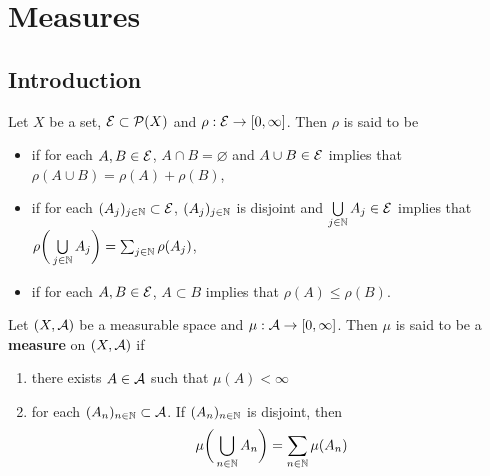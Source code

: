 \documentclass{book}
\begin{document}
	
	
	
	
	
	
	
	
	
	
	
	
	
	
	
	
	
	
	
	
	
	
	
	
	
	
	
	
	
	
	
	
	
	
	
	
	
	
	\newpage
	\chapter{Measures}
	
	\section{Introduction}
	
	
	
	\begin{defn} 
		Let $X$ be a set, $\mathcal{E} \subset \mathcal{P}(X)$ and $\rho: \mathcal{E} \rightarrow [0,\infty]$. Then $\rho$ is said to be 
		\begin{itemize}
			\item {} if for each $A, B \in \mathcal{E}$, $A \cap B = \varnothing$ and $A \cup B \in \mathcal{E}$ implies that $\rho(A \cup B) = \rho(A) + \rho(B)$,
			\item {} if for each $(A_j)_{j \in \mathbb{N}} \subset \mathcal{E}$, $(A_j)_{j \in \mathbb{N}}$ is disjoint and $\bigcup\limits_{j \in \mathbb{N}} A_j \in \mathcal{E}$ implies that $\rho \bigg( \bigcup\limits_{j \in \mathbb{N}} A_j \bigg) = \sum_{j \in \mathbb{N}} \rho(A_j)$,
			\item {} if for each $A, B \in \mathcal{E}$, $A \subset B$ implies that $\rho(A) \leq \rho(B)$.
		\end{itemize}
	\end{defn}
	
	\begin{defn} 
		Let $(X, \mathcal{A})$ be a measurable space and $\mu:\mathcal{A} \rightarrow [0,\infty]$. Then $\mu$ is said to be a \textbf{measure} on $(X, \mathcal{A})$ if 
		\begin{enumerate}
			\item there exists $A \in \mathcal{A}$ such that $\mu(A)< \infty$
			\item for each $(A_n)_{n \in \mathbb{N}} \subset \mathcal{A}$. If $(A_n)_{n \in \mathbb{N}}$ is disjoint, then $$\mu\bigg(\bigcup_{n \in \mathbb{N}}A_n \bigg) = \sum_{n \in \mathbb{N}}\mu(A_n)$$
		\end{enumerate}
	\end{defn}
	
\end{document}
